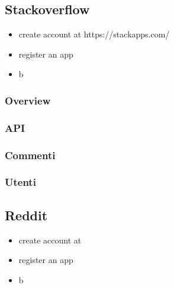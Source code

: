 

\subsection {Stackoverflow} %

\begin{itemize}
    \item create account at https://stackapps.com/
    \item register an app
    \item b
\end{itemize}

\subsubsection {Overview}
\subsubsection {API}

\subsubsection {Commenti}
\subsubsection {Utenti}



\subsection {Reddit} %

\begin{itemize}
    \item create account at 
    \item register an app
    \item b
\end{itemize}



